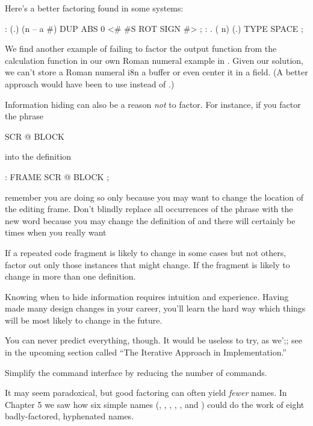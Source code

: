 Here's a better factoring found in some \Forth{} systems:

\begin{Code}
: (.)  (n -- a #)  DUP ABS 0  <# #S  ROT SIGN  #> ;
: .  ( n)  (.) TYPE SPACE ;
\end{Code}
We find another example of failing to factor the output function from
the calculation function in our own Roman numeral example in .
Given our solution, we can't store a Roman numeral i8n a buffer or
even center it in a field. (A better approach would have been to use
 instead of .)

Information hiding can also be a reason \emph{not} to factor. For
instance, if you factor the phrase

\begin{Code}
SCR @ BLOCK
\end{Code}
into the definition

\begin{Code}
: FRAME   SCR @ BLOCK ;
\end{Code}
remember you are doing so only because you may want to change the
location of the editing frame. Don't blindly replace all occurrences
of the phrase with the new word  because you may change the
definition of  and there will certainly be times when you really
want 

\begin{tip}
If a repeated code fragment is likely to change in some cases but not
others, factor out only those instances that might change. If the
fragment is likely to change in more than one definition.
\end{tip}
Knowing when to hide information requires intuition and experience.
Having made many design changes in your career, you'll learn the hard
way which things will be most likely to change in the future.

You can never predict everything, though. It would be useless to try,
as we';; see in the upcoming section called ``The Iterative Approach
in Implementation.''

\begin{tip}
Simplify the command interface by reducing the number of commands.
\end{tip}
It may seem paradoxical, but good factoring can often yield
\emph{fewer} names. In Chapter 5 we saw how six simple names
(, , , ,
, and ) could do the work of eight
badly-factored, hyphenated names.

